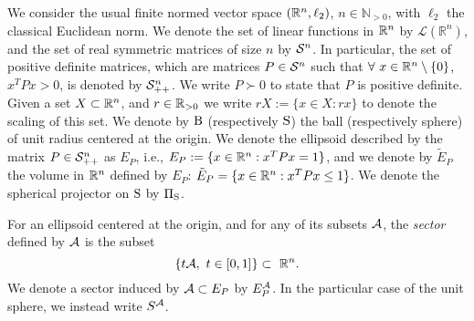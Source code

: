 We consider the usual finite normed vector space $(\mathbb{R}^n,\ell_2)$, $n \in \mathbb{N}_{> 0}$, with $\ell_2$ the classical Euclidean norm. We denote the set of linear functions in $\mathbb{R}^n$ by $\mathcal{L}(\mathbb{R}^n)$, and the set of real symmetric matrices of size $n$ by $\mathcal{S}^n$. In particular, the set of positive definite matrices, which are matrices $P \in \mathcal{S}^n$ such that $\forall\ x \in \mathbb{R}^n \setminus \{0\}$, $x^TPx > 0$, is denoted by $\mathcal{S}^n_{++}$. We write $P \succ 0$ to state that $P$ is positive definite. Given a set $X \subset \mathbb{R}^n$, and $r \in \mathbb{R}_{> 0}$ we write \mbox{$rX := \{x \in X : rx\}$} to denote the scaling of this set. We denote by $\text{B}$ (respectively $\text{S}$) the ball (respectively sphere) of unit radius centered at the origin.  We denote the ellipsoid described by the matrix $P \in \mathcal{S}^n_{++}$ as $E_P$, i.e., $E_P:= \{x \in \mathbb{R}^n: x^TPx = 1\}$, and we denote by $\tilde{E}_P$ the volume in $\mathbb{R}^n$ defined by $E_P$: $\tilde{E}_P = \{x \in \mathbb{R}^n: x^TPx \leq 1\}$. We denote the spherical projector on $\text{S}$ by $\Pi_{\text{S}}$. %


For an ellipsoid centered at the origin, and for any of its subsets $\mathcal{A}$, the \emph{sector} defined by $\mathcal{A}$ is the subset $$\{t \calA, \ t \in [0,1]\} \subset\ \R^n.$$ We denote a sector induced by $\mathcal{A} \subset E_P$ by $E_P^{\mathcal{A}}$. In the particular case of the unit sphere, we instead write $S^{\mathcal{A}}$.

